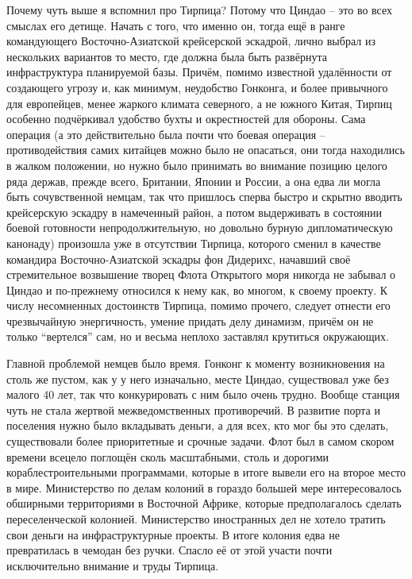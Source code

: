 Почему чуть выше я вспомнил про Тирпица? Потому что Циндао – это во всех смыслах его детище. Начать с того, что именно он, тогда ещё в ранге командующего Восточно-Азиатской крейсерской эскадрой, лично выбрал из нескольких вариантов то место, где должна была быть развёрнута инфраструктура планируемой базы. Причём, помимо известной удалённости от создающего угрозу и, как минимум, неудобство Гонконга, и более привычного для европейцев, менее жаркого климата северного, а не южного Китая, Тирпиц особенно подчёркивал удобство бухты и окрестностей для обороны. Сама операция (а это действительно была почти что боевая операция – противодействия самих китайцев можно было не опасаться, они тогда находились в жалком положении, но нужно было принимать во внимание позицию целого ряда держав, прежде всего, Британии, Японии и России, а она едва ли могла быть сочувственной немцам, так что пришлось сперва быстро и скрытно вводить крейсерскую эскадру в намеченный район, а потом выдерживать в состоянии боевой готовности непродолжительную, но довольно бурную дипломатическую канонаду) произошла уже в отсутствии Тирпица, которого сменил в качестве командира Восточно-Азиатской эскадры фон Дидерихс, начавший своё стремительное возвышение творец Флота Открытого моря никогда не забывал о Циндао и по-прежнему относился к нему как, во многом, к своему проекту. К числу несомненных достоинств Тирпица, помимо прочего, следует отнести его чрезвычайную энергичность, умение придать делу динамизм, причём он не только “вертелся” сам, но и весьма неплохо заставлял крутиться окружающих.

Главной проблемой немцев было время. Гонконг к моменту возникновения на столь же пустом, как у у него изначально, месте Циндао, существовал уже без малого 40 лет, так что конкурировать с ним было очень трудно. Вообще станция чуть не стала жертвой межведомственных противоречий. В развитие порта и поселения нужно было вкладывать деньги, а для всех, кто мог бы это сделать, существовали более приоритетные и срочные задачи. Флот был в самом скором времени всецело поглощён сколь масштабными, столь и дорогими кораблестроительными программами, которые в итоге вывели его на второе место в мире. Министерство по делам колоний в гораздо большей мере интересовалось обширными территориями в Восточной Африке, которые предполагалось сделать переселенческой колонией. Министерство иностранных дел не хотело тратить свои деньги на инфраструктурные проекты. В итоге колония едва не превратилась в чемодан без ручки. Спасло её от этой участи почти исключительно внимание и труды Тирпица.

